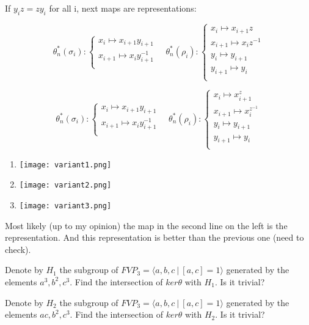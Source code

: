 \documentclass{article}
\begin{document}
If $y_i z = z y_i$ for all i, next maps are representations:

\begin{equation}\label{defGV}
\theta_n^*(\sigma_i):
\begin{cases}
x_i \mapsto x_{i+1}y_{i+1}\\
x_{i+1} \mapsto x_iy_{i+1}^{-1}\\
\end{cases}\quad
\theta_n^*(\rho_i):
\begin{cases}
x_i \mapsto x_{i+1}z\\
x_{i+1} \mapsto x_iz^{-1}\\
y_i \mapsto y_{i+1}\\
y_{i+1} \mapsto y_i\\
\end{cases}
\end{equation}

\begin{equation}\label{defGV}
\theta_n^*(\sigma_i):
\begin{cases}
x_i \mapsto x_{i+1}y_{i+1}\\
x_{i+1} \mapsto x_iy_{i+1}^{-1}\\
\end{cases}\quad
\theta_n^*(\rho_i):
\begin{cases}
x_i \mapsto x_{i+1}^z\\
x_{i+1} \mapsto x_i^{z^{-1}}\\
y_i \mapsto y_{i+1}\\
y_{i+1} \mapsto y_i\\
\end{cases}
\end{equation}

\begin{enumerate}
    \item \texttt{[image: variant1.png]}
     \item \texttt{[image: variant2.png]}
      \item \texttt{[image: variant3.png]}
\end{enumerate}
Most likely (up to my opinion) the map in the second line on the left is the representation. And this representation is better than the previous one (need to check).

Denote by $H_1$ the subgroup of $FVP_3=\langle a,b,c~|~[a,c]=1\rangle$ generated by the elements $a^3,b^2,c^3$. Find the intersection of $ker{\theta}$ with $H_1$. Is it trivial?

Denote by $H_2$ the subgroup of $FVP_3=\langle a,b,c~|~[a,c]=1\rangle$ generated by the elements $ac,b^2,c^3$. Find the intersection of $ker{\theta}$ with $H_2$. Is it trivial?
\end{document}
